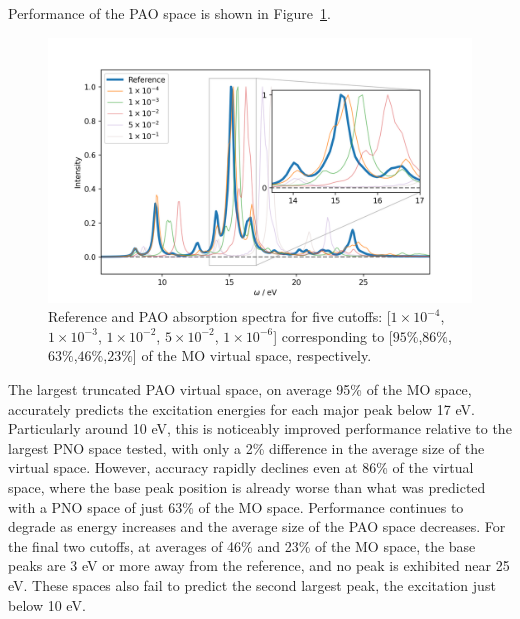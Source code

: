 Performance of the PAO space is shown in Figure~\ref{fig:pao_abs}. 
\begin{figure} 
    \centering
    \includegraphics[scale=.6]{p3/figures/pao_abs.png}
    \caption{Reference and PAO absorption spectra for five cutoffs: 
    [$1\times 10^{-4}$, $1\times 10^{-3}$, $1\times 10^{-2}$, $5\times 10^{-2}$, 
    $1\times 10^{-6}$] corresponding to [$95\%$,$86\%$,$63\%$,$46\%$,$23\%$]
    of the MO virtual space, respectively.}
    \label{fig:pao_abs}
\end{figure}
The largest truncated PAO virtual space, on average 95\% of the MO space, accurately 
predicts the excitation energies for each major peak below 17 eV. Particularly around 10 eV, 
this is noticeably improved performance relative to the largest PNO space tested, 
with only a 2\% difference in the average size of the virtual space. 
However, accuracy rapidly declines even at 86\% of the virtual space, where the base peak
position is already worse than what was predicted with a PNO space of just 63\% of the 
MO space. Performance continues to degrade as energy increases and the average size of 
the PAO space decreases. For the final two cutoffs, at averages of 46\% and 23\% of the
MO space, the base peaks are 3 eV or more away from the reference, and no peak is 
exhibited near 25 eV. These spaces also fail to predict the second largest peak, the 
excitation just below 10 eV. 

